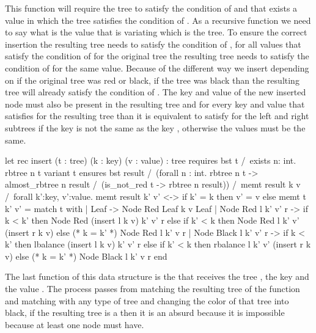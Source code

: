 This function will require the tree to satisfy the condition of  and that exists a value in which the tree satisfies the condition
of . As a recursive function we need to say what is the value that is variating which is the tree. To ensure the correct insertion
the resulting tree needs to satisfy the condition of , for all values that satisfy the condition of  for the original
tree the resulting tree needs to satisfy the condition of  for the same value. Because of the different way we insert depending
on if the original tree was red or black, if the tree was black than the resulting tree will already satisfy the condition of . The key and
value of the new inserted node must also be present in the resulting tree and for every key  and value 
that satisfies  for the resulting tree than it is equivalent to satisfy  for the left and right subtrees if the key 
is not the same as the key , otherwise the values must be the same.


\begin{whylang}
    let rec insert (t : tree) (k : key) (v : value) : tree
        requires { bst t /\ exists n: int. rbtree n t }
        variant { t }
        ensures { bst result /\
        (forall n : int. rbtree n t -> almost_rbtree n result /\
            (is_not_red t -> rbtree n result)) /\
        memt result k v /\
        forall k':key, v':value.
        memt result k' v' <-> if k' = k then v' = v else memt t k' v' }
    = match t with
        | Leaf ->
            Node Red Leaf k v Leaf
        | Node Red l k' v' r ->
            if k < k' then Node Red (insert l k v) k' v' r
            else if k' < k then Node Red l k' v' (insert r k v)
            else (* k = k' *) Node Red l k' v r
        | Node Black l k' v' r ->
            if k < k' then lbalance (insert l k v) k' v' r
            else if k' < k then rbalance l k' v' (insert r k v)
            else (* k = k' *) Node Black l k' v r
        end
\end{whylang}

The last function of this data structure is the  that receives the tree , the key  and
the value . The process passes from matching the resulting tree of the function  and matching with
any type of tree and changing the color of that tree into black, if the resulting tree is a  then it is an absurd because 
it is impossible because at least one node must have.

